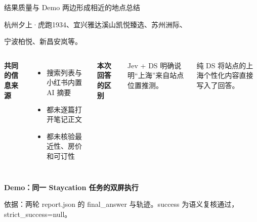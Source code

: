 \documentclass[aspectratio=169,11pt]{beamer}
\newcommand{\src}[1]{\par\vfill{\fontsize{6.5}{8}\selectfont\color{Muted}依据：#1\par}}
\newcommand{\lead}[1]{{\large\color{Green}#1}\par\vspace{3mm}}
\newcommand{\key}[1]{\textbf{\color{Green}#1}}
\newcommand{\gap}{\par\vspace{1.8mm}}
\begin{document}
\begin{frame}{结果质量与 Demo}
\lead{两边形成相近的地点总结}
杭州夕上·虎跑1934、宜兴雅达溪山凯悦臻选、苏州洲际、\par\gap
宁波柏悦、新昌安岚等。
\vspace{5mm}
\begin{columns}[T,onlytextwidth]
\textbf{共同的信息来源}\gap
\begin{itemize}\setlength\itemsep{2.5mm}
\item 搜索列表与小红书内置 AI 摘要
\item 都未逐篇打开笔记正文
\item 都未核验最近性、房价和可订性
\end{itemize}
\textbf{本次回答的区别}\gap
Jev + DS 明确说明“上海”来自站点位置推测。\par\gap
纯 DS 将站点的上海个性化内容直接写入了回答。
\end{columns}
\vspace{5mm}
{\large\key{Demo：同一 Staycation 任务的双屏执行}}\par
\src{两轮 report.json 的 final\_answer 与轨迹。success 为语义复核通过，strict\_success=null。}
\end{frame}
\end{document}
